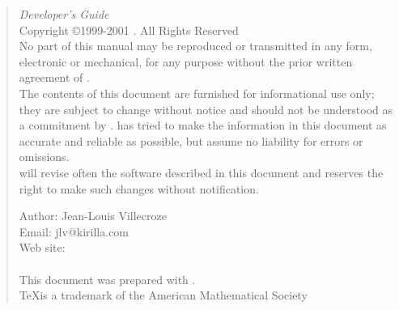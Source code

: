 \begin{small}
\begin{quote}

\thispagestyle{empty}

\begin{figure}[h] 
\centerline{ 
} 
\end{figure}

{\em \squirrel Developer's Guide}\\
Copyright \copyright 1999-2001 \etech . All Rights Reserved\\

No part of this manual may be reproduced or transmitted in any form, electronic or mechanical, for any purpose without the prior written agreement of \etech .\\

The contents of this document are furnished for informational use only; they are subject to change without notice and should not be understood as a commitment by \etech. \etech has tried to make the information in this document as accurate and reliable as possible, but assume no liability for errors or omissions.\\

\etech will revise often the software described in this document and reserves the right to make such changes without notification.\\

\vspace{1cm}

Author: Jean-Louis Villecroze\\
Email: jlv@kirilla.com\\
Web site: \myurl\\
\\
This document was prepared with \LaTeXe.\\
\TeX is a trademark of the American Mathematical Society
\end{quote}
\end{small}
